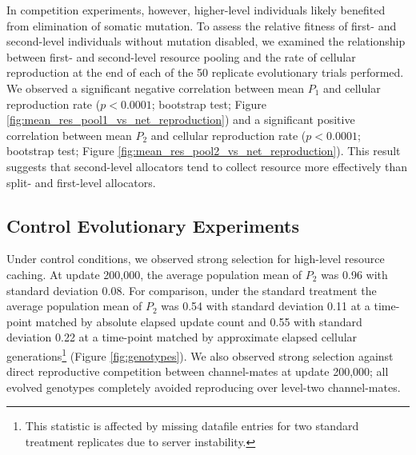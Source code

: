 

In competition experiments, however, higher-level individuals likely benefited from elimination of somatic mutation.
To assess the relative fitness of first- and second-level individuals without mutation disabled, we examined the relationship between first- and second-level resource pooling and the rate of cellular reproduction at the end of each of the 50 replicate evolutionary trials performed.
We observed a significant negative correlation between mean $P_1$ and cellular reproduction rate ($p < 0.0001$; bootstrap test; Figure \ref{fig:mean_res_pool1_vs_net_reproduction}) and a significant positive correlation between mean $P_2$ and cellular reproduction rate ($p < 0.0001$; bootstrap test; Figure \ref{fig:mean_res_pool2_vs_net_reproduction}).
This result suggests that second-level allocators tend to collect resource more effectively than split- and first-level allocators.

\subsection{Control Evolutionary Experiments}



Under control conditions, we observed strong selection for high-level resource caching.
At update 200,000, the average population mean of $P_2$ was 0.96 with standard deviation 0.08.
For comparison, under the standard treatment the average population mean of $P_2$ was 0.54 with standard deviation 0.11 at a time-point matched by absolute elapsed update count and 0.55 with standard deviation 0.22 at a time-point matched by approximate elapsed cellular generations\footnote{This statistic is affected by missing datafile entries for two standard treatment replicates due to server instability.} (Figure \ref{fig:genotypes}).
We also observed strong selection against direct reproductive competition between channel-mates at update 200,000; all evolved genotypes completely avoided reproducing over level-two channel-mates.

